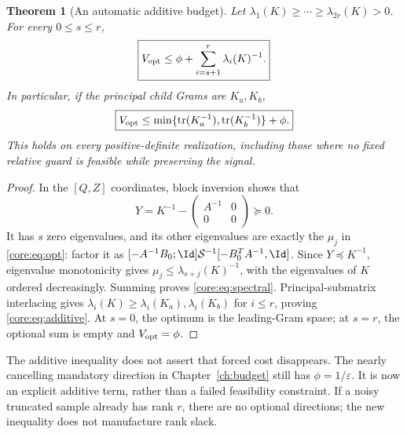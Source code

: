 \documentclass[11pt,oneside,openany,a4paper]{book}
\numberwithin{equation}{chapter}
\newtheorem{theorem}{Theorem}[chapter]
\theoremstyle{definition}
\theoremstyle{remark}
\DeclareMathOperator{\tr}{tr}\DeclareMathOperator{\rank}{rank}
\begin{document}
\begin{theorem}[An automatic additive budget]\label{core:thm:additive}
Let $\lambda_1(K)\ge\cdots\ge\lambda_{2r}(K)>0$. For every $0\le s\le r$,
\begin{equation}\label{core:eq:spectral}
 \boxed{V_{\rm opt}\le\phi+\sum_{i=s+1}^{r}\lambda_i(K)^{-1}.}
\end{equation}
In particular, if the principal child Grams are $K_a,K_b$,
\begin{equation}\label{core:eq:additive}
 \boxed{V_{\rm opt}\le\min\{\tr(K_a^{-1}),\tr(K_b^{-1})\}+\phi.}
\end{equation}
This holds on every positive-definite realization, including those where no fixed relative guard is feasible while preserving the signal.
\end{theorem}
\begin{proof}
In the $[Q,Z]$ coordinates, block inversion shows that
\[
 Y=K^{-1}-\begin{pmatrix}A^{-1}&0\\0&0\end{pmatrix}\succeq0.
\]
It has $s$ zero eigenvalues, and its other eigenvalues are exactly the $\mu_j$ in \eqref{core:eq:opt}: factor it as $[-A^{-1}B_0;\Id]\mathcal S^{-1}[-B_0^TA^{-1},\Id]$. Since $Y\preceq K^{-1}$, eigenvalue monotonicity gives $\mu_j\le\lambda_{s+j}(K)^{-1}$, with the eigenvalues of $K$ ordered decreasingly. Summing proves \eqref{core:eq:spectral}. Principal-submatrix interlacing gives $\lambda_i(K)\ge\lambda_i(K_a),\lambda_i(K_b)$ for $i\le r$, proving \eqref{core:eq:additive}. At $s=0$, the optimum is the leading-Gram space; at $s=r$, the optional sum is empty and $V_{\rm opt}=\phi$.
\end{proof}

The additive inequality does not assert that forced cost disappears. The nearly cancelling mandatory direction in Chapter~\ref{ch:budget} still has $\phi=1/\varepsilon$. It is now an explicit additive term, rather than a failed feasibility constraint. If a noisy truncated sample already has rank $r$, there are no optional directions; the new inequality does not manufacture rank slack.
\end{document}
